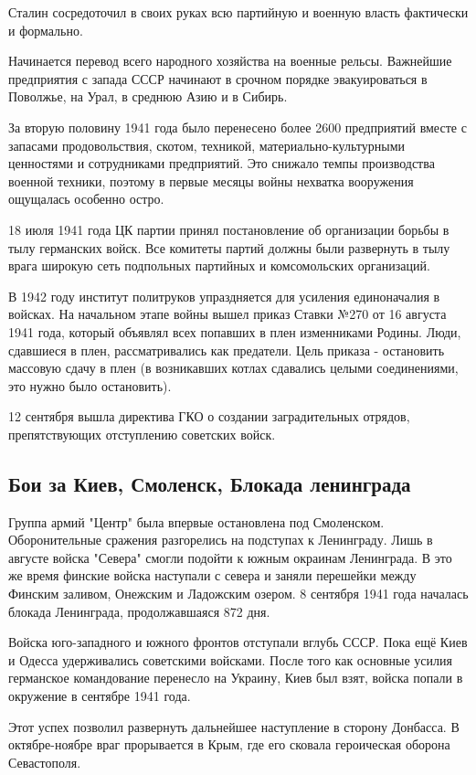 Сталин сосредоточил в своих руках всю партийную и военную власть фактически и формально.

Начинается перевод всего народного хозяйства на военные рельсы. Важнейшие предприятия с запада СССР начинают в срочном порядке эвакуироваться в Поволжье, на Урал, в среднюю Азию и в Сибирь.

За вторую половину 1941 года было перенесено более 2600 предприятий вместе с запасами продовольствия, скотом, техникой, материально-культурными ценностями и сотрудниками предприятий. Это снижало темпы производства военной техники, поэтому в первые месяцы войны нехватка вооружения ощущалась особенно остро.

18 июля 1941 года ЦК партии принял постановление об организации борьбы в тылу германских войск. Все комитеты партий должны были развернуть в тылу врага широкую сеть подпольных партийных и комсомольских организаций.

В 1942 году институт политруков упраздняется для усиления единоначалия в войсках. На начальном этапе войны вышел приказ Ставки №270 от 16 августа 1941 года, который объявлял всех попавших в плен изменниками Родины. Люди, сдавшиеся в плен, рассматривались как предатели. Цель приказа - остановить массовую сдачу в плен (в возникавших котлах сдавались целыми соединениями, это нужно было остановить).

12 сентября вышла директива ГКО о создании заградительных отрядов, препятствующих отступлению советских войск.
\subsection{Бои за Киев, Смоленск, Блокада ленинграда}
Группа армий "Центр" была впервые остановлена под Смоленском. Оборонительные сражения разгорелись на подступах к Ленинграду. Лишь в августе войска "Севера" смогли подойти к южным окраинам Ленинграда. В это же время финские войска наступали с севера и заняли перешейки между Финским заливом, Онежским и Ладожским озером. 8 сентября 1941 года началась блокада Ленинграда, продолжавшаяся 872 дня.

Войска юго-западного и южного фронтов отступали вглубь СССР. Пока ещё Киев и Одесса удерживались советскими войсками. После того как основные усилия германское командование перенесло на Украину, Киев был взят, войска попали в окружение в сентябре 1941 года.

Этот успех позволил развернуть дальнейшее наступление в сторону Донбасса. В октябре-ноябре враг прорывается в Крым, где его сковала героическая оборона Севастополя.

